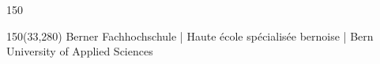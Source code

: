 \begin{titlepage}
\begin{flushleft}
\begin{textblock}{150}
\end{textblock}
\end{flushleft}

\begin{textblock}{150}(33,280)
\noindent 
\color{bfhgrey}\fontsize{9pt}{10pt}\selectfont
Berner Fachhochschule | Haute \'ecole sp\'ecialis\'ee bernoise | Bern University of Applied Sciences
\color{black}\selectfont
\end{textblock}


\end{titlepage}

%
%

